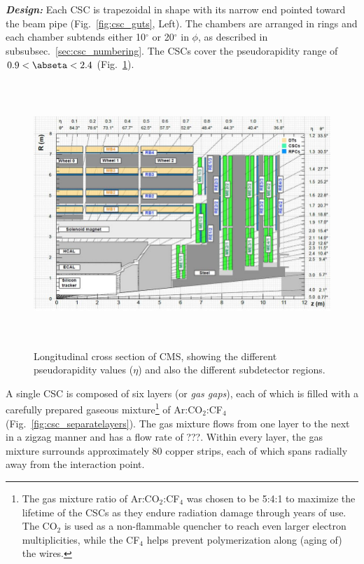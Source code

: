 \textit{\textbf{Design:}}
Each CSC is trapezoidal in shape with its narrow end pointed toward the beam pipe (Fig.~\ref{fig:csc_guts}, Left).
The chambers are arranged in rings and each chamber subtends either 10$^\circ$ or 20$^\circ$ in $\phi$, as described in subsubsec.~\ref{sec:csc_numbering}.
The CSCs cover the pseudorapidity range of $0.9 < \abseta < 2.4$ (Fig.~\ref{fig:cms_long_view_subdetectors}).
\begin{figure}[pbth]
    \centering
    \includegraphics[width=15cm,height=10cm,keepaspectratio]{figures/cms/cms_longitudinal_view.png}
        \caption{
        Longitudinal cross section of CMS, showing the different pseudorapidity values ($\eta$) and also the different subdetector regions.
        }
        \label{fig:cms_long_view_subdetectors}
\end{figure}
A single CSC is composed of six layers (or \emph{gas gaps}), each of which is filled with a carefully prepared gaseous mixture\footnote{
    The gas mixture ratio of Ar:CO$_{2}$:CF$_{4}$ was chosen to be 5:4:1 to maximize the lifetime of the CSCs as they endure radiation damage through years of use.
    The CO$_{2}$ is used as a non-flammable quencher to reach even larger electron multiplicities, while the CF$_{4}$ helps prevent polymerization along (aging of) the wires.
    }
of Ar:CO$_{2}$:CF$_{4}$ (Fig.~\ref{fig:csc_separatelayers}).
The gas mixture flows from one layer to the next in a zigzag manner and has a flow rate of ???.
Within every layer, the gas mixture surrounds approximately 80 copper strips, each of which spans radially away from the interaction point.

